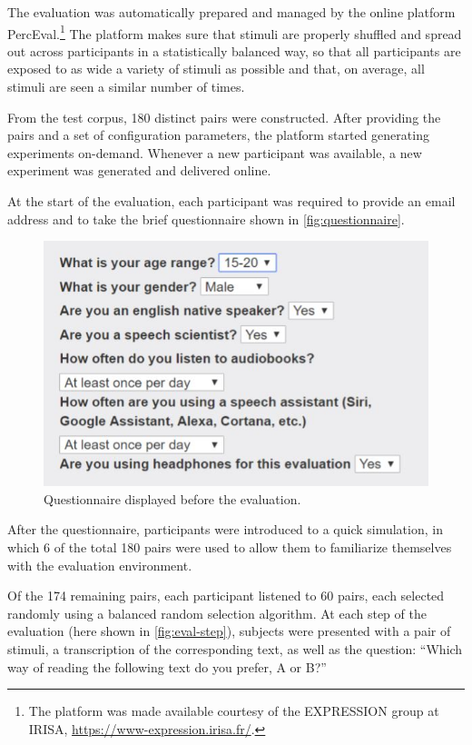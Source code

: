 The evaluation was automatically prepared and managed by the online platform PercEval.\footnote{The platform was made available courtesy of the EXPRESSION group at IRISA, \url{https://www-expression.irisa.fr/}.}
The platform makes sure that stimuli are properly shuffled and spread out across participants in a statistically balanced way, so that all participants are exposed to as wide a variety of stimuli as possible and that, on average, all stimuli are seen a similar number of times.

From the test corpus, 180 distinct pairs were constructed.
After providing the pairs and a set of configuration parameters, the platform started generating experiments on-demand.
Whenever a new participant was available, a new experiment was generated and delivered online.

At the start of the evaluation, each participant was required to provide an email address and to take the brief questionnaire shown in \autoref{fig:questionnaire}.

\begin{figure}[H]
\centering
\includegraphics[scale=.5]{figures/questionnaire.png}
\caption[Evaluation questionnaire]{Questionnaire displayed before the evaluation.}
\label{fig:questionnaire}
\end{figure}

After the questionnaire, participants were introduced to a quick simulation, in which 6 of the total 180 pairs were used to allow them to familiarize themselves with the evaluation environment.

Of the 174 remaining pairs, each participant listened to 60 pairs, each selected randomly using a balanced random selection algorithm.
At each step of the evaluation (here shown in \autoref{fig:eval-step}), subjects were presented with a pair of stimuli, a transcription of the corresponding text, as well as the question: ``Which way of reading the following text do you prefer, A or B?''


